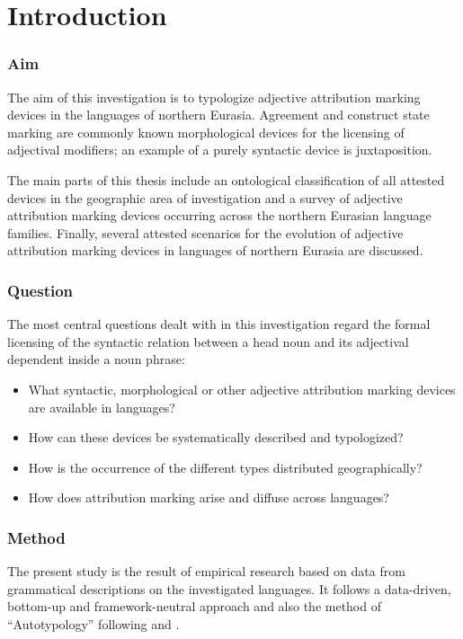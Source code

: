 
\chapter{Introduction}
\subsection*{Aim}
The aim of this investigation is to typologize adjective attribution marking devices in the languages of northern Eurasia. Agreement and construct state marking are commonly known morphological devices for the licensing of adjectival modifiers; an example of a purely syntactic device is juxtaposition.  

The main parts of this thesis include an ontological classification of all attested devices in the geographic area of investigation and a survey of adjective attribution marking devices occurring across the northern Eurasian language families. Finally, several attested scenarios for the evolution of adjective attribution marking devices in languages of northern Eurasia are discussed.

\subsection*{Question}
The most central questions dealt with in this investigation regard the formal licensing of the syntactic relation between a head noun and its adjectival dependent inside a noun phrase:
\begin{itemize}
\item What syntactic, morphological or other adjective attribution marking devices are available in languages? 
\item How can these devices be systematically described and typologized? 
\item How is the occurrence of the different types distributed geographically? 
\item How does attribution marking arise and diffuse across languages?
\end{itemize}

\subsection*{Method}
The present study is the result of empirical research based on data from grammatical descriptions on the investigated languages. It follows a data-driven, bottom-up and framework-neutral approach \parencite[cf.][]{haspelmath2010} and also the method of “Autotypology” following \textcite{bickel-etal2002} and \textcite{bickel2007}.

